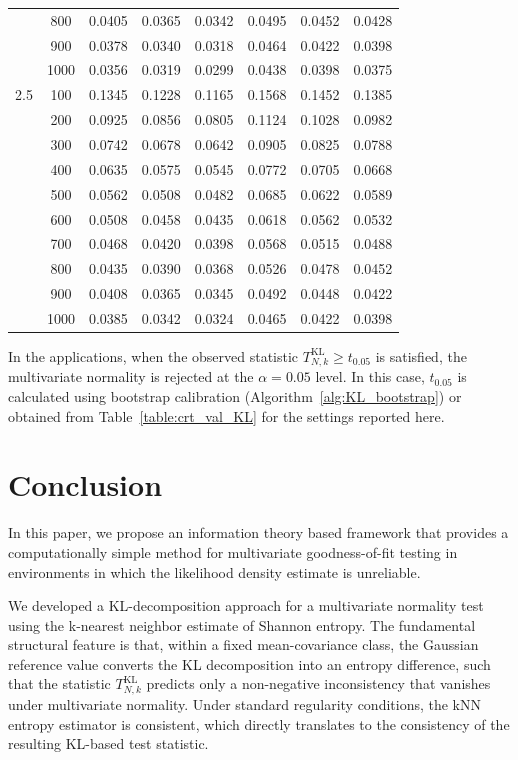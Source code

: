 \documentclass[12pt,a4paper]{article}
\theoremstyle{definition}
\theoremstyle{plain}
\begin{document}
{\begin{table}[htbp]
\begin{tabular*}{\textwidth}{@{\extracolsep{\fill}} cc | ccc | ccc }
    & 800  & 0.0405 & 0.0365 & 0.0342 & 0.0495 & 0.0452 & 0.0428 \\
    & 900  & 0.0378 & 0.0340 & 0.0318 & 0.0464 & 0.0422 & 0.0398 \\
    & 1000 & 0.0356 & 0.0319 & 0.0299 & 0.0438 & 0.0398 & 0.0375 \\
\hline
2.5 & 100  & 0.1345 & 0.1228 & 0.1165 & 0.1568 & 0.1452 & 0.1385 \\
    & 200  & 0.0925 & 0.0856 & 0.0805 & 0.1124 & 0.1028 & 0.0982 \\
    & 300  & 0.0742 & 0.0678 & 0.0642 & 0.0905 & 0.0825 & 0.0788 \\
    & 400  & 0.0635 & 0.0575 & 0.0545 & 0.0772 & 0.0705 & 0.0668 \\
    & 500  & 0.0562 & 0.0508 & 0.0482 & 0.0685 & 0.0622 & 0.0589 \\
    & 600  & 0.0508 & 0.0458 & 0.0435 & 0.0618 & 0.0562 & 0.0532 \\
    & 700  & 0.0468 & 0.0420 & 0.0398 & 0.0568 & 0.0515 & 0.0488 \\
    & 800  & 0.0435 & 0.0390 & 0.0368 & 0.0526 & 0.0478 & 0.0452 \\
    & 900  & 0.0408 & 0.0365 & 0.0345 & 0.0492 & 0.0448 & 0.0422 \\
    & 1000 & 0.0385 & 0.0342 & 0.0324 & 0.0465 & 0.0422 & 0.0398 \\
\hline
\end{tabular*}
\end{table}

In the applications, when the observed statistic $T_{N,k}^{\mathrm{KL}} \ge t_{0.05}$ is satisfied, the multivariate normality is rejected at the $\alpha=0.05$ level. In this case, $t_{0.05}$ is calculated using bootstrap calibration (Algorithm~\ref{alg:KL_bootstrap}) or obtained from Table~\ref{table:crt_val_KL} for the settings reported here.




\section{Conclusion}
\label{sec:conclusion}

In this paper, we propose an information theory based framework that provides a computationally simple method for multivariate goodness-of-fit testing in environments in which the likelihood density estimate is unreliable. 

We developed a KL-decomposition approach for a multivariate normality test using the k-nearest neighbor estimate of Shannon entropy. The fundamental structural feature is that, within a fixed mean-covariance class, the Gaussian reference value converts the KL decomposition into an entropy difference, such that the statistic $T_{N,k}^{\mathrm{KL}}$ predicts only a non-negative inconsistency that vanishes under multivariate normality. Under standard regularity conditions, the kNN entropy estimator is consistent, which directly translates to the consistency of the resulting KL-based test statistic.

}
\end{document}
